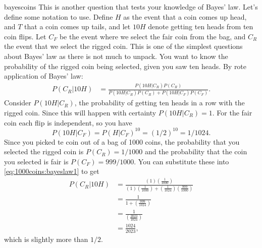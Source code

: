 \begin{answer}{bayescoins}
This is another question that tests your knowledge of Bayes' law.
Let's define some notation to use.
Define $H$ as the event that a coin comes up head, and $T$ that a coin comes up tails, and let $10H$ denote getting ten heads from ten coin flips.
Let $C_{F}$ be the event where we select the fair coin from the bag, and $C_{R}$ the event that we select the rigged coin.
This is one of the simplest questions about Bayes' law as there is not much to unpack.
You want to know the probability of the rigged coin being selected, given you saw ten heads.
By rote application of Bayes' law:
\begin{align}
\label{eq:1000coins:bayeslaw1}
 P( C_{R} \vert 10H)
 &=
 \frac{
    P( 10H \vert C_{R} )
    P( C_{R} )
 }{
    P( 10H \vert C_{R} )
    P( C_{R} )
    +
    P( 10H \vert C_{F} )
    P( C_{F} )
 }
 \text{.}
\end{align}
Consider
$P( 10H \vert C_{R} )$, the probability of getting ten heads in a row with the rigged coin.
Since this will happen with certainty
$P( 10H \vert C_{R} ) = 1$.
For the fair coin each flip is independent, so you have
$$P( 10H \vert C_{F} )=P( H \vert C_{F} )^{10}= ({1}/{2})^{10} = {1}/{1024}.$$
Since you picked te coin out of a bag of 1000 coins, the probability that you selected the rigged coin is
$P(C_{R}) = 1/1000$ and the probability that the coin you selected is fair is
$P(C_{F}) = 999/1000$.
You can substitute these into \eqref{eq:1000coins:bayeslaw1} to get
\begin{align*}
 P( C_{R} \vert 10H)
 &=
 \frac{
    (1)
   \left( \frac{1}{1000} \right)
 }{
    (1)
   \left( \frac{1}{1000} \right)
    +
    \left(\frac{1}{1024}\right)
    \left(\frac{999}{1000}\right)
 }
 \\
 &=
 \frac{
    1
 }{
    1
    +
    \left(\frac{999}{1024}\right)
 }
 \\
 &=
 \frac{
    1
 }{
    \left(\frac{2023}{1024}\right)
 }
 \\
 &=
    \frac{1024}{2023}
 \text{,}
\end{align*}
which is slightly more than $1/2$.


\end{answer}
